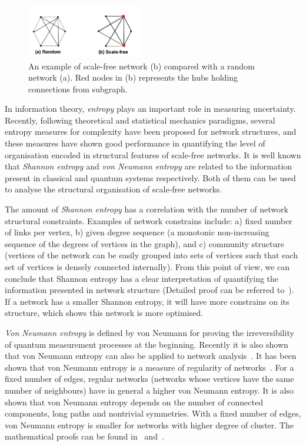 \begin{figure}[!t]
    \centering
    \includegraphics[width=0.45\textwidth]{./images/Scale-free.png}
    \caption{An example of scale-free network (b) compared with a random network (a). Red nodes in (b) represents the hubs holding connections from subgraph.}
    \label{fig:scalefree}
\end{figure}

In information theory, \emph{entropy} plays an important role in measuring uncertainty. Recently, following theoretical and statistical mechanics paradigms, several entropy measures for complexity have been proposed for network structures, and these measures have shown good performance in quantifying the level of organisation encoded in structural features of scale-free networks. It is well known that \emph{Shannon entropy} and \emph{von Neumann entropy} are related to the information present in classical and quantum systems respectively. Both of them can be used to analyse the structural organisation of scale-free networks\cite{anand2009entropy}. 

The amount of \emph{Shannon entropy} has a correlation with the number of network structural constraints. Examples of network constrains include: a) fixed number of links per vertex, b) given degree sequence (a monotonic non-increasing sequence of the degrees of vertices in the graph), and c) community structure (vertices of the network can be easily grouped into sets of vertices such that each set of vertices is densely connected internally). From this point of view, we can conclude that Shannon entropy has a clear interpretation of quantifying the information presented in network structure (Detailed proof can be referred to~\cite{anand2009entropy}). If a network has a smaller Shannon entropy, it will have more constrains on its structure, which shows this network is more optimised. 

\emph{Von Neumann entropy} is defined by von Neumann for proving the irreversibility of quantum measurement processes at the beginning. Recently it is also shown that von Neumann entropy can also be applied to network analysis~\cite{passerini2008neumann}. It has been shown that von Neumann entropy is a measure of regularity of networks~\cite{passerini2008neumann}. For a fixed number of edges, regular networks (networks whose vertices have the same number of neighbours) have in general a higher von Neumann entropy. It is also shown that von Neumann entropy depends on the number of connected components, long paths and nontrivial symmetries. With a fixed number of edges, von Neumann entropy is smaller for networks with higher degree of cluster. The mathematical proofs can be found in~\cite{passerini2008neumann} and~\cite{anand2009entropy}.

